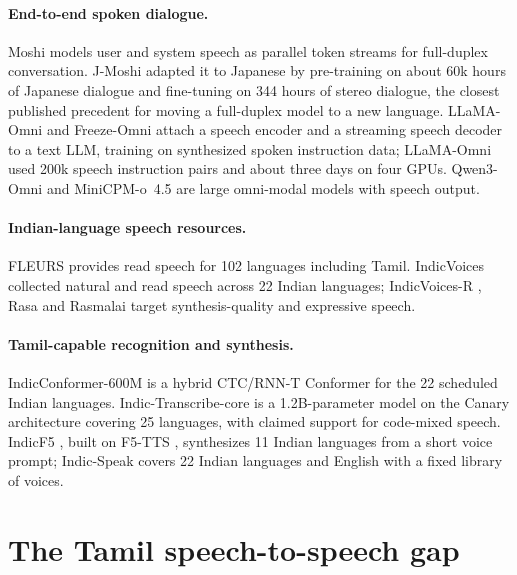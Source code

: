 \documentclass[11pt]{article}
\begin{document}
\paragraph{End-to-end spoken dialogue.}
Moshi \citep{defossez2024moshi} models user and system speech as parallel token streams for
full-duplex conversation. J-Moshi \citep{ohashi2025jmoshi} adapted it to Japanese by pre-training on
about 60k hours of Japanese dialogue and fine-tuning on 344 hours of stereo dialogue, the closest
published precedent for moving a full-duplex model to a new language. LLaMA-Omni
\citep{fang2024llamaomni} and Freeze-Omni \citep{wang2024freezeomni} attach a speech encoder and a
streaming speech decoder to a text LLM, training on synthesized spoken instruction data; LLaMA-Omni
used 200k speech instruction pairs and about three days on four GPUs. Qwen3-Omni
\citep{xu2025qwen3omni} and MiniCPM-o~4.5 \citep{cui2026minicpmo} are large omni-modal models with
speech output.

\paragraph{Indian-language speech resources.}
FLEURS \citep{conneau2022fleurs} provides read speech for 102 languages including Tamil. IndicVoices
\citep{javed2024indicvoices} collected natural and read speech across 22 Indian languages;
IndicVoices-R \citep{sankar2024indicvoicesr}, Rasa \citep{varadhan2024rasa} and Rasmalai
\citep{sankar2025rasmalai} target synthesis-quality and expressive speech.

\paragraph{Tamil-capable recognition and synthesis.}
IndicConformer-600M \citep{ai4bharat2025indicconformer} is a hybrid CTC/RNN-T Conformer for the 22
scheduled Indian languages. Indic-Transcribe-core \citep{bodhan2026indictranscribe} is a 1.2B-parameter
model on the Canary architecture \citep{sekoyan2025canary} covering 25 languages, with claimed
support for code-mixed speech. IndicF5 \citep{praveen2025indicf5}, built on F5-TTS
\citep{chen2024f5tts}, synthesizes 11 Indian languages from a short voice prompt; Indic-Speak
\citep{bodhan2026indicspeak} covers 22 Indian languages and English with a fixed library of voices.

\section{The Tamil speech-to-speech gap}
\label{sec:gap}
\end{document}
